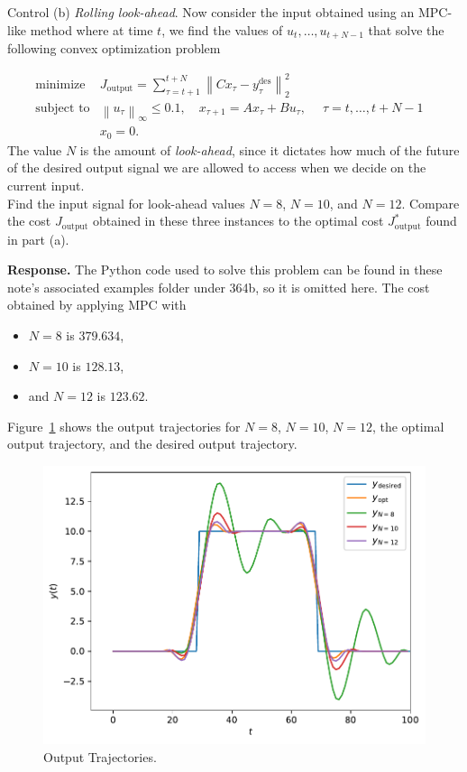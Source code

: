 \begin{chapter}{Control}
    \vspace{.1cm}
    \noindent (b) \textit{Rolling look-ahead}. Now consider the input obtained using an MPC-like method
    where at time $t$, we find the values of $u_t, \ldots, u_{t+N-1}$ that solve the following convex optimization
    problem

    \[\begin{array}{lll}
        \text{minimize} \; & J_{\text{output}} =  \sum_{\tau=t+1}^{t+N}\left\lVert Cx_\tau - y_\tau^{\text{des}} \right\rVert_{2}^2 & \\
        \text{subject to} & \left\lVert u_\tau \right\rVert_{\infty} \le 0.1, \quad x_{\tau+1} = Ax_\tau + Bu_\tau, \; \quad \tau = t, \ldots, t + N - 1 & \\
        &x_0 = 0.
        \end{array}\]
    The value $N$ is the amount of \textit{look-ahead}, since it dictates how much of the future of the desired
    output signal we are allowed to access when we decide on the current input.\\
    Find the input signal for look-ahead values $N=8$, $N=10$, and $N=12$. Compare the cost $J_{\text{output}}$
    obtained in these three instances to the optimal cost $J_{\text{output}}^{*}$ found in part (a).
    
    \vspace{.1cm} 
    \noindent \textbf{Response.} The Python code used to solve this problem can be found in these note's associated examples folder under 364b,
    so it is omitted here. The cost obtained by applying MPC with 
    \begin{itemize}
        \item $N = 8$ is $379.634$,
        \item $N = 10$ is $128.13$,
        \item and $N=12$ is $123.62$.
    \end{itemize}
    Figure~\ref{fig:364-hw7-traj-out} shows the output trajectories for $N=8$, $N=10$, $N=12$,
    the optimal output trajectory, and the desired output trajectory.

    \begin{figure}[h]
        \centering
        \includegraphics[width=\linewidth]{examples/364b/364b_mpc_output.pdf}
        \caption{Output Trajectories.}
        \label{fig:364-hw7-traj-out}
    \end{figure}
    
\end{chapter}